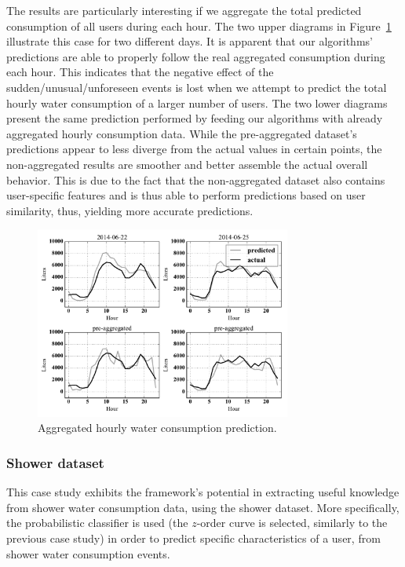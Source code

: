 The results are particularly interesting if we aggregate the total predicted consumption of all users during each hour. The two upper diagrams in Figure~\ref{figure9} illustrate this case for two different days. It is apparent that our algorithms' predictions are able to properly follow the real aggregated consumption during each hour. This indicates that the negative effect of the sudden/unusual/unforeseen events is lost when we attempt to predict the total hourly water consumption of a larger number of users. The two lower diagrams present the same prediction performed by feeding our algorithms with already aggregated hourly consumption data. While the pre-aggregated dataset's predictions appear to less diverge from the actual values in certain points, the non-aggregated results are smoother and better assemble the actual overall behavior. This is due to the fact that the non-aggregated dataset also contains user-specific features and is thus able to perform predictions based on user similarity, thus, yielding more accurate predictions.

\begin{figure}[!ht]
	\centering
	\includegraphics[width=0.75\textwidth]{figures/figure9.pdf}
	\caption{Aggregated hourly water consumption prediction.}
	\label{figure9}
\end{figure}

\subsubsection{Shower dataset}
\label{subsubsec:case_study2}
This case study exhibits the framework's potential in extracting useful knowledge from shower water consumption data, using the shower dataset. More specifically, the probabilistic classifier is used (the $z$-order curve is selected, similarly to the previous case study) in order to predict specific characteristics of a user, from shower water consumption events.

